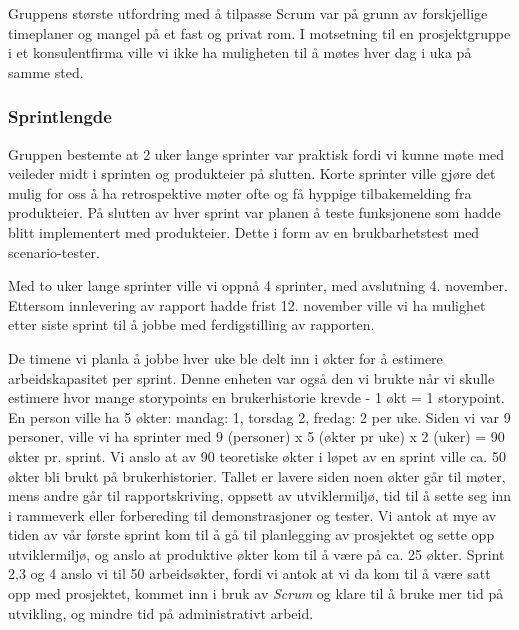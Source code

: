 \documentclass[12pt,a4paper,norsk]{article}
\begin{document}
    \bigskip\begin{adjustwidth}{2.5em}{0pt}
    \end{adjustwidth}
    \bigskip Gruppens største utfordring med å tilpasse Scrum var på grunn av forskjellige timeplaner og mangel på et fast og privat rom. I motsetning til en prosjektgruppe i et konsulentfirma ville vi ikke ha muligheten til å møtes hver dag i uka på samme sted.

  \subsubsection{Sprintlengde}
  Gruppen bestemte at 2 uker lange sprinter var praktisk fordi vi kunne møte med veileder midt i sprinten og produkteier på slutten. Korte sprinter ville gjøre det mulig for oss å ha retrospektive møter ofte og få hyppige tilbakemelding fra produkteier. På slutten av hver sprint var planen å teste funksjonene som hadde blitt implementert med produkteier. Dette i form av en brukbarhetstest med scenario-tester.

    Med to uker lange sprinter ville vi oppnå 4 sprinter, med avslutning 4. november. Ettersom innlevering av rapport hadde frist 12. november ville vi ha mulighet etter siste sprint til å jobbe med ferdigstilling av rapporten.

    De timene vi planla å jobbe hver uke ble delt inn i økter for å estimere arbeidskapasitet per sprint. Denne enheten var også den vi brukte når vi skulle estimere hvor mange storypoints en brukerhistorie krevde - 1 økt = 1 storypoint. En person ville ha 5 økter: mandag: 1, torsdag 2, fredag: 2 per uke. Siden vi var 9 personer, ville vi ha sprinter med 9 (personer) x 5 (økter pr uke) x 2 (uker) = 90 økter pr. sprint. Vi anslo at av 90 teoretiske økter i løpet av en sprint ville ca. 50 økter bli brukt på brukerhistorier. Tallet er lavere siden noen økter går til møter, mens andre går til rapportskriving, oppsett av utviklermiljø, tid til å sette seg inn i rammeverk eller forbereding til demonstrasjoner og tester. Vi antok at mye av tiden av vår første sprint kom til å gå til planlegging av prosjektet og sette opp utviklermiljø, og anslo at produktive økter kom til å være på ca. 25 økter. Sprint 2,3 og 4 anslo vi til 50 arbeidsøkter, fordi vi antok at vi da kom til å være satt opp med prosjektet, kommet inn i bruk av \textit{Scrum} og klare til å bruke mer tid på utvikling, og mindre tid på administrativt arbeid.
\end{document}
